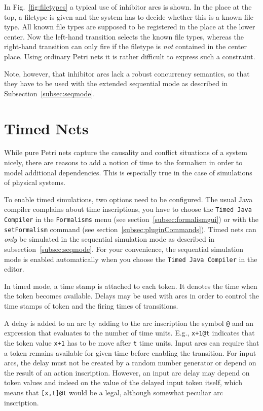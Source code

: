 
In Fig.~\ref{fig:filetypes} a typical use of inhibitor arcs is
shown. In the place at the top, a filetype is given and
the system has to decide whether this is a known
file type. All known file types are supposed to be registered in the
place at the lower center. Now the left-hand transition selects the known
file types, whereas the right-hand transition can only
fire if the filetype is \emph{not} contained in the center place.
Using ordinary Petri nets it is rather difficult to express
such a constraint.

Note, however, that inhibitor arcs lack a robust
concurrency semantics, so that they have to be used with the
extended sequential mode as described in
Subsection~\ref{subsec:seqmode}.


\section{Timed Nets}
\label{sec:timedNets}
While pure Petri nets capture the causality and
conflict situations of a system nicely, there are reasons to
add a notion of time to the formalism in order to model
additional dependencies. This is especially true in the case of
simulations of physical systems.

To enable timed simulations, two options need to be
configured.
The usual Java compiler complains about time inscriptions, you have
to choose the \texttt{Timed Java Compiler} in the
\texttt{Formalisms} menu (see section~\ref{subsec:formalismgui}) or
with the \texttt{setFormalism} command (see
section~\ref{subsec:pluginCommands}).
Timed nets can \emph{only} be simulated in the sequential simulation mode
as described in subsection~\ref{subsec:seqmode}.
For your convenience, the sequential simulation mode is enabled
automatically when you choose the \texttt{Timed Java Compiler}
in the editor.

In timed mode, a time stamp is attached to each token. It denotes the
time when the token becomes available. Delays may be used with arcs
in order to control the time stamps of token and the firing times
of transitions.

A delay is added to an arc by adding to the arc inscription
the symbol \texttt{@} and an expression that evaluates to the number
of time units. E.g., \texttt{x+1@t} indicates that the token value
\texttt{x+1} has to be move after \texttt{t} time units.
Input arcs can require that
a token remains available for given time before
enabling the transition. For input arcs, the delay must not be created
by a random number generator or depend on the result of an
action inscription. However, an input arc delay may depend
on token values and indeed on the value of the delayed
input token itself, which means that \texttt{[x,t]@t}
would be a legal, although somewhat peculiar arc inscription.

